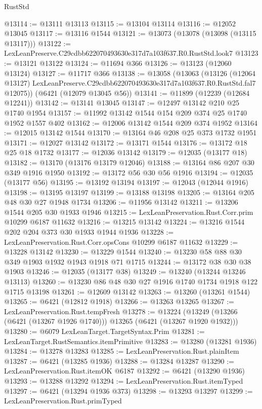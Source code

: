 \begin{lexlean}{RustStd}
\begin{coremodule}
@13114 := @13111 @13113
@13115 := @13104 @13114
@13116 := @12052 @13045
@13117 := @13116 @1544
@13121 := @13073 (@13078 (@13098 (@13115 @13117)))
@13122 := LexLeanPreserve.C29cdbb622070493630e317d7a103f637.R0.RustStd.look7
@13123 := @13121 @13122
@13124 := @11694 @366
@13126 := @13123 (@12060 @13124)
@13127 := @11717 @366
@13138 := @13058
    (@13063
      (@13126
        (@12064 @13127)
        LexLeanPreserve.C29cdbb622070493630e317d7a103f637.R0.RustStd.fal7
        @12075))
    (@6421 (@12079 @13045 @56))
@13141 := @11899 (@12239 (@12684 @12241))
@13142 := @13141 @13045
@13147 := @12497 @13142 @210 @25 @1740 @1954
@13157 := @11992 @13142 @1544 @154 @209 @374 @25 @1740 @1952 @1557 @402
@13162 := @12006 @13142 @1544 @209 @374 @1952
@13164 := @12015 @13142 @1544
@13170 := @13164 @46 @208 @25 @373 @1732 @1951
@13171 := @12027 @13142
@13172 := @13171 @1544
@13176 := @13172 @18 @25 @18 @1732
@13177 := @12036 @13142
@13179 := @12035 (@13177 @18)
@13182 := @13170 (@13176 @13179 @12046)
@13188 := @13164 @86 @207 @30 @349 @1916 @1950
@13192 := @13172 @56 @30 @56 @1916
@13194 := @12035 (@13177 @56)
@13195 := @13192 @13194
@13197 := @12043 (@12044 @1916)
@13198 := @13195 @13197
@13199 := @13188 @13198
@13205 := @13164 @205 @48 @30 @27 @1948 @1734
@13206 := @11956 @13142
@13211 := @13206 @1544 @205 @30 @1933 @1946
@13215 := LexLeanPreservation.Rust.Corr.prim @10299 @6187 @11632
@13216 := @13215 @13142
@13224 := @13216 @1544 @202 @204 @373 @30 @1933 @1944 @1936
@13228 := LexLeanPreservation.Rust.Corr.opsCons @10299 @6187 @11632
@13229 := @13228 @13142
@13230 := @13229 @1544
@13240 := @13230 @58 @88 @30 @349 @1903 @1932 @1943 @1918 @71 @1715
@13244 := @13172 @38 @30 @38 @1903
@13246 := @12035 (@13177 @38)
@13249 := @13240 (@13244 @13246 @13113)
@13260 := @13230 @86 @48 @30 @27 @1916 @1740 @1734 @1918 @122 @1715 @13198
@13261 := @12609 @13142
@13263 := @13260 (@13261 @1544)
@13265 := @6421 (@12812 @1918)
@13266 := @13263 @13265
@13267 := LexLeanPreservation.Rust.tempFresh
@13278 := @13224 (@13249 (@13266 (@6421 (@13267 @1926 @1740))) @13265 (@6421 (@13267 @1920 @1932)))
@13280 := @6079 LexLeanTarget.TargetSyntax.Prim
@13281 := LexLeanTarget.RustSemantics.itemPrimitive
@13283 := @13280 (@13281 @1936)
@13284 := @13278 @13283
@13285 := LexLeanPreservation.Rust.plainItem
@13287 := @6421 (@13285 @1936)
@13288 := @13284 @13287
@13290 := LexLeanPreservation.Rust.itemOK @6187
@13292 := @6421 (@13290 @1936)
@13293 := @13288 @13292
@13294 := LexLeanPreservation.Rust.itemTyped
@13297 := @6421 (@13294 @1936 @373)
@13298 := @13293 @13297
@13299 := LexLeanPreservation.Rust.primTyped

\end{coremodule}
\end{lexlean}
